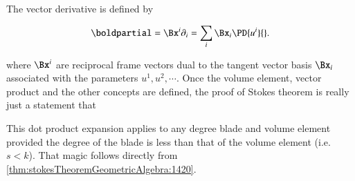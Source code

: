 %
%

The vector derivative is defined by

\begin{equation}\label{eqn:stokesTheoremTheStatement:1400}
\boldpartial = \Bx^i \partial_i = \sum_i \Bx_i \PD{u^i}{}.
\end{equation}

where \( \Bx^i \) are reciprocal frame vectors dual to the tangent vector basis \( \Bx_i \) associated with the parameters \( u^1, u^2, \cdots \).
Once the volume element, vector product and the other concepts are defined, the proof of
Stokes theorem is really just a statement that

This dot product expansion applies to any degree blade and volume element provided the degree of the blade is less than that of the volume element (i.e. \(s < k\)).  That magic follows directly from \cref{thm:stokesTheoremGeometricAlgebra:1420}.
